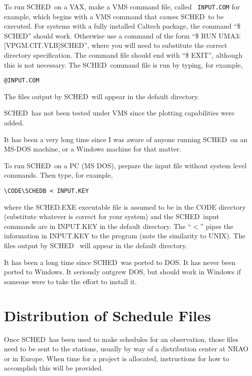 \documentclass{report}
\newcommand{\sched}{{\sc SCHED}}
\newcommand{\schedb}{{\sc SCHED~}}
\begin{document}
To run \schedb on a VAX, make a VMS command file, called {\tt
INPUT.COM} for example, which begins with a VMS command that causes
\schedb to be executed. For systems with a fully installed Caltech
package, the command ``\$ \sched'' should work. Otherwise use a
command of the form ``\$ RUN UMA3:[VPGM.CIT.VLB]\sched'', where
you will need to substitute the correct directory specification. The
command file should end with ``\$ EXIT'', although this is not
necessary. The \schedb command file is run by typing, for example,
\begin{verbatim}
@INPUT.COM
\end{verbatim}
The files output by \schedb will appear in the default directory.

\schedb has not been tested under VMS since the plotting
capabilities were added.


It has been a very long time since I was aware of anyone running
\schedb on an MS-DOS machine, or a Windows machine for that matter.

To run \schedb on a PC (MS DOS), prepare the input file without
system level commands. Then type, for example,
\begin{verbatim}
\CODE\SCHEDB < INPUT.KEY
\end{verbatim}
where the SCHED.EXE executable file is assumed to be in the CODE
directory (substitute whatever is correct for your system) and the
\schedb input commands are in INPUT.KEY in the default
directory. The ``$<$'' pipes the information in INPUT.KEY to the
program (note the similarity to UNIX). The files output by \schedb
will appear in the default directory.

It has been a long time since \schedb was ported to DOS.  It has
never been ported to Windows.  It seriously outgrew DOS, but should
work in Windows if someone were to take the effort to install it.


\section{\label{SEC:DISFIL}Distribution of Schedule Files}

Once \schedb has been used to make schedules for an observation, those
files need to be sent to the stations, usually by way of a distribution
center at NRAO or in Europe.  When time for a project is allocated,
instructions for how to accomplish this will be provided.
\end{document}
